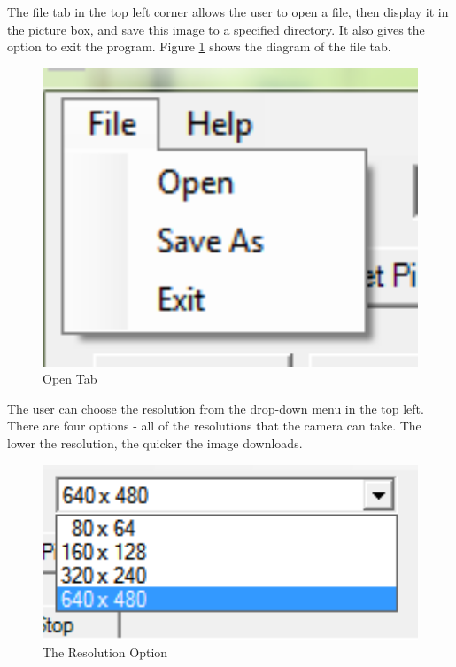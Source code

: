 \documentclass[a4paper,11pt]{article}
\begin{document}
The file tab in the top left corner allows the user to open a file, then display it in the picture box, and save this image to a specified directory. It also gives the option to exit the program. Figure \ref{openTab} shows the diagram of the file tab.

\begin{figure}[!htbp]
\begin{center}
\includegraphics[width=1.0\textwidth]{FileButton.png}  
\caption{Open Tab \label{openTab}}
\end{center}
\end{figure}

The user can choose the resolution from the drop-down menu in the top left. There are four options - all of the resolutions that the camera can take. The lower the resolution, the quicker the image downloads. 

\begin{figure}[!htbp]
\begin{center}
\includegraphics[width=1.0\textwidth]{comboBoxResolution.png}   
\caption{The Resolution Option \label{resOp}}
\end{center}
\end{figure}
\end{document}
